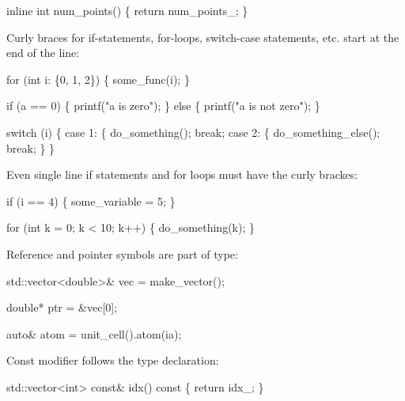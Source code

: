 \begin{DoxyItemize}
\begin{DoxyCode}
\textcolor{keyword}{inline} \textcolor{keywordtype}{int} num\_points()
\{
    \textcolor{keywordflow}{return} num\_points\_;
\}
\end{DoxyCode}

\item Curly braces for if-\/statements, for-\/loops, switch-\/case statements, etc. start at the end of the line\+: 
\begin{DoxyCode}
\textcolor{keywordflow}{for} (\textcolor{keywordtype}{int} i: \{0, 1, 2\}) \{
    some\_func(i);
\}

\textcolor{keywordflow}{if} (a == 0) \{
    printf(\textcolor{stringliteral}{"a is zero"});
\} \textcolor{keywordflow}{else} \{
    printf(\textcolor{stringliteral}{"a is not zero"});
\}

\textcolor{keywordflow}{switch} (i) \{
    \textcolor{keywordflow}{case} 1: \{
        do\_something();
        \textcolor{keywordflow}{break};
    \textcolor{keywordflow}{case} 2: \{
        do\_something\_else();
        \textcolor{keywordflow}{break};
    \}
\}
\end{DoxyCode}

\item Even single line \textquotesingle{}if\textquotesingle{} statements and \textquotesingle{}for\textquotesingle{} loops must have the curly brackes\+: 
\begin{DoxyCode}
\textcolor{keywordflow}{if} (i == 4) \{
    some\_variable = 5;
\}

\textcolor{keywordflow}{for} (\textcolor{keywordtype}{int} k = 0; k < 10; k++) \{
    do\_something(k);
\}
\end{DoxyCode}

\item Reference and pointer symbols are part of type\+: 
\begin{DoxyCode}
std::vector<double>& vec = make\_vector();

\textcolor{keywordtype}{double}* ptr = &vec[0];

\textcolor{keyword}{auto}& atom = unit\_cell().atom(ia);
\end{DoxyCode}

\item Const modifier follows the type declaration\+: 
\begin{DoxyCode}
std::vector<int> \textcolor{keyword}{const}& idx()\textcolor{keyword}{ const}
\textcolor{keyword}{}\{
    \textcolor{keywordflow}{return} idx\_;
\}
\end{DoxyCode}


\end{DoxyItemize}
